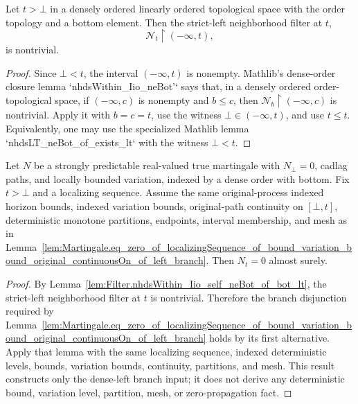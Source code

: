 \begin{lemma}\label{lem:Filter.nhdsWithin_Iio_self_neBot_of_bot_lt}
Let \(t>\bot\) in a densely ordered linearly ordered topological space with
the order topology and a bottom element.  Then the strict-left neighborhood
filter at \(t\),
\[
  \mathcal N_t\!\restriction(-\infty,t),
\]
is nontrivial.
\end{lemma}

\begin{proof}
Since \(\bot<t\), the interval \((-\infty,t)\) is nonempty.  Mathlib's
dense-order closure lemma `nhdsWithin_Iio_neBot'` says that, in a densely
ordered order-topological space, if \((-\infty,c)\) is nonempty and \(b\le c\),
then \(\mathcal N_b\!\restriction(-\infty,c)\) is nontrivial.  Apply it with
\(b=c=t\), use the witness \(\bot\in(-\infty,t)\), and use \(t\le t\).
Equivalently, one may use the specialized Mathlib lemma
`nhdsLT_neBot_of_exists_lt` with the witness \(\bot<t\).
\end{proof}

\begin{lemma}\label{lem:Martingale.eq_zero_of_localizingSequence_of_bound_variation_bound_original_continuousOn_of_dense_left}
Let \(N\) be a strongly predictable real-valued true martingale with
\(N_\bot=0\), cadlag paths, and locally bounded variation, indexed by a
dense order with bottom.  Fix \(t>\bot\) and a localizing sequence.  Assume
the same original-process indexed horizon bounds, indexed variation bounds,
original-path continuity on \([\bot,t]\), deterministic monotone partitions,
endpoints, interval membership, and mesh as in
Lemma~\ref{lem:Martingale.eq_zero_of_localizingSequence_of_bound_variation_bound_original_continuousOn_of_left_branch}.
Then \(N_t=0\) almost surely.
\end{lemma}

\begin{proof}
By Lemma~\ref{lem:Filter.nhdsWithin_Iio_self_neBot_of_bot_lt}, the
strict-left neighborhood filter at \(t\) is nontrivial.  Therefore the branch
disjunction required by
Lemma~\ref{lem:Martingale.eq_zero_of_localizingSequence_of_bound_variation_bound_original_continuousOn_of_left_branch}
holds by its first alternative.  Apply that lemma with the same localizing
sequence, indexed deterministic levels, bounds, variation bounds, continuity,
partitions, and mesh.  This result constructs only the dense-left branch
input; it does not derive any deterministic bound, variation level, partition,
mesh, or zero-propagation fact.
\end{proof}

